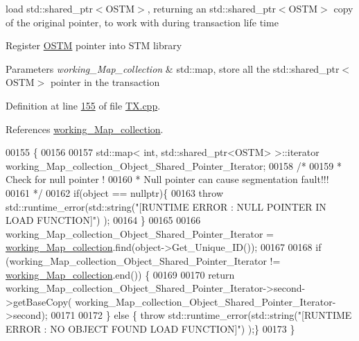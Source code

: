 load std\+::shared\+\_\+ptr$<$\+O\+S\+T\+M$>$, returning an std\+::shared\+\_\+ptr$<$\+O\+S\+T\+M$>$ copy of the original pointer, to work with during transaction life time 

Register \hyperlink{class_o_s_t_m}{O\+S\+TM} pointer into S\+TM library


\begin{DoxyParams}{Parameters}
{\em working\+\_\+\+Map\+\_\+collection} & std\+::map, store all the std\+::shared\+\_\+ptr$<$\+O\+S\+T\+M$>$ pointer in the transaction \\
\hline
\end{DoxyParams}


Definition at line \hyperlink{_t_x_8cpp_source_l00155}{155} of file \hyperlink{_t_x_8cpp_source}{T\+X.\+cpp}.



References \hyperlink{_t_x_8h_source_l00094}{working\+\_\+\+Map\+\_\+collection}.


\begin{DoxyCode}
00155                                                        \{
00156 
00157     std::map< int, std::shared\_ptr<OSTM> >::iterator working\_Map\_collection\_Object\_Shared\_Pointer\_Iterator;
00158     \textcolor{comment}{/*}
00159 \textcolor{comment}{     * Check for null pointer !
}
00160 \textcolor{comment}{     * Null pointer can cause segmentation fault!!!
}
00161 \textcolor{comment}{     */}
00162     \textcolor{keywordflow}{if}(\textcolor{keywordtype}{object} == \textcolor{keyword}{nullptr})\{
00163         \textcolor{keywordflow}{throw} std::runtime\_error(std::string(\textcolor{stringliteral}{"[RUNTIME ERROR : NULL POINTER IN LOAD FUNCTION]"}) );
00164     \}
00165 
00166         working\_Map\_collection\_Object\_Shared\_Pointer\_Iterator = 
      \hyperlink{class_t_x_a81aafda16e2f20e36ec6c68e584668ff_a81aafda16e2f20e36ec6c68e584668ff}{working\_Map\_collection}.find(object->Get\_Unique\_ID());
00167 
00168     \textcolor{keywordflow}{if} (working\_Map\_collection\_Object\_Shared\_Pointer\_Iterator != 
      \hyperlink{class_t_x_a81aafda16e2f20e36ec6c68e584668ff_a81aafda16e2f20e36ec6c68e584668ff}{working\_Map\_collection}.end()) \{
00169 
00170         \textcolor{keywordflow}{return} working\_Map\_collection\_Object\_Shared\_Pointer\_Iterator->second->getBaseCopy(
      working\_Map\_collection\_Object\_Shared\_Pointer\_Iterator->second);
00171         
00172     \} \textcolor{keywordflow}{else} \{ \textcolor{keywordflow}{throw} std::runtime\_error(std::string(\textcolor{stringliteral}{"[RUNTIME ERROR : NO OBJECT FOUND LOAD FUNCTION]"}) );\}
00173 \}
\end{DoxyCode}
